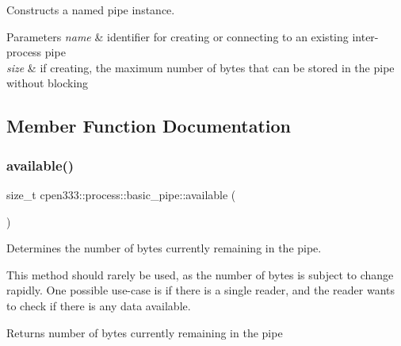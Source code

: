 Constructs a named pipe instance. 


\begin{DoxyParams}{Parameters}
{\em name} & identifier for creating or connecting to an existing inter-\/process pipe \\
\hline
{\em size} & if creating, the maximum number of bytes that can be stored in the pipe without blocking \\
\hline
\end{DoxyParams}


\subsection{Member Function Documentation}
\mbox{\label{classcpen333_1_1process_1_1basic__pipe_a409e54ba4fd21f9769105804eb118fae}} 
\subsubsection{\texorpdfstring{available()}{available()}}
{\footnotesize\ttfamily size\+\_\+t cpen333\+::process\+::basic\+\_\+pipe\+::available (\begin{DoxyParamCaption}{ }\end{DoxyParamCaption})\hspace{0.3cm}{\ttfamily [inline]}}



Determines the number of bytes currently remaining in the pipe. 

This method should rarely be used, as the number of bytes is subject to change rapidly. One possible use-\/case is if there is a single reader, and the reader wants to check if there is any data available.

\begin{DoxyReturn}{Returns}
number of bytes currently remaining in the pipe 
\end{DoxyReturn}
\mbox{\label{classcpen333_1_1process_1_1basic__pipe_a9c0d0787a431449f58d730ae9d2c4f1d}} 
